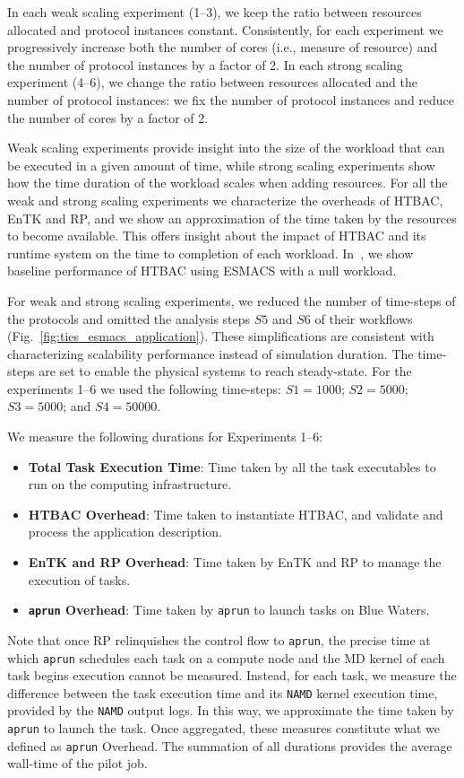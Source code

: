 In each weak scaling experiment (1--3), we keep the ratio between resources
allocated and protocol instances constant. Consistently, for each experiment
we progressively increase both the number of cores (i.e., measure of
resource) and the number of protocol instances by a factor of 2. In each
strong scaling experiment (4--6), we change the ratio between resources
allocated and the number of protocol instances: we fix the number of protocol
instances and reduce the number of cores by a factor of 2.

Weak scaling experiments provide insight into the size of the workload that
can be executed in a given amount of time, while strong scaling experiments
show how the time duration of the workload scales when adding resources. For
all the weak and strong scaling experiments we characterize the overheads of
HTBAC, EnTK and RP, and we show an approximation of the time taken by the
resources to become available. This offers insight about the impact of HTBAC
and its runtime system on the time to completion of each workload.
In~\cite{dakka2017}, we show baseline performance of HTBAC using ESMACS with
a null workload.

For weak and strong scaling experiments, we reduced the number of time-steps
of the protocols and omitted the analysis steps $S5$ and $S6$ of their
workflows (Fig.~\ref{fig:ties_esmacs_application}). These simplifications are
consistent with characterizing scalability performance instead of simulation
duration. The time-steps are set to enable the physical systems to reach 
steady-state. For the experiments 1--6 we used the following 
time-steps: $S1=1000$; $S2=5000$; $S3=5000$; and $S4=50000$.

We measure the following durations for Experiments 1--6:
\begin{itemize}
    \item \textbf{Total Task Execution Time}: Time taken by all the task
    executables to run on the computing infrastructure.
    \item \textbf{HTBAC Overhead}: Time taken to instantiate HTBAC, and
    validate and process the application description.
    \item \textbf{EnTK and RP Overhead}: Time taken by EnTK and RP to manage
    the execution of tasks.
    \item \textbf{\texttt{aprun} Overhead}: Time taken by \texttt{aprun} to
    launch tasks on Blue Waters.
\end{itemize}

Note that once RP relinquishes the control flow to \texttt{aprun}, the
precise time at which \texttt{aprun} schedules each task on a compute node
and the MD kernel of each task begins execution cannot be measured. Instead,
for each task, we measure the difference between the task execution time and
its \texttt{NAMD} kernel execution time, provided by the \texttt{NAMD} output
logs. In this way, we approximate the time taken by \texttt{aprun} to launch
the task. Once aggregated, these measures constitute what we defined as
\texttt{aprun} Overhead. The summation of all durations provides the average
wall-time of the pilot job.

